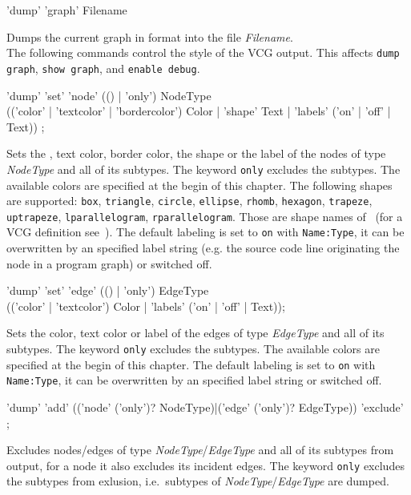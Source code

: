 \begin{rail}
  'dump' 'graph' Filename
\end{rail}
Dumps the current graph in  format into the file \emph{Filename}.\\

The following commands control the style of the VCG output. This affects \texttt{dump graph}, \texttt{show graph}, and \texttt{enable debug}. 
\begin{rail}
  'dump' 'set' 'node' (() | 'only') NodeType \\ (('color' | 'textcolor' | 'bordercolor') Color | 'shape' Text | 'labels' ('on' | 'off' | Text)) ;
\end{rail}
Sets the , text color, border color, the shape or the label of the nodes of type \emph{NodeType} and all of its subtypes.
The keyword \texttt{only} excludes the subtypes. The available colors are specified at the begin of this chapter. 
The following shapes are supported: \texttt{box}, \texttt{triangle}, \texttt{circle}, \texttt{ellipse}, \texttt{rhomb}, \texttt{hexagon}, \texttt{trapeze}, \texttt{uptrapeze}, \texttt{lparallelogram}, \texttt{rparallelogram}.
Those are shape names of \yComp\ (for a VCG definition see~\cite{vcg}).
The default labeling is set to \texttt{on} with \texttt{Name:Type}, it can be overwritten by an specified label string (e.g. the source code line originating the node in a program graph) or switched off.

\begin{rail}
  'dump' 'set' 'edge' (() | 'only') EdgeType \\ (('color' | 'textcolor') Color | 'labels' ('on' | 'off' | Text));
\end{rail}
Sets the color, text color or label of the edges of type \emph{EdgeType} and all of its subtypes.
The keyword \texttt{only} excludes the subtypes. The available colors are specified at the begin of this chapter.
The default labeling is set to \texttt{on} with \texttt{Name:Type}, it can be overwritten by an specified label string or switched off.

\begin{rail}
  'dump' 'add' (('node' ('only')? NodeType)|('edge' ('only')? EdgeType)) 'exclude' ;
\end{rail}
Excludes nodes/edges of type \emph{NodeType}/\emph{EdgeType} and all of its subtypes from output, for a node it also excludes its incident edges.
The keyword \texttt{only} excludes the subtypes from exlusion, i.e.\ subtypes of \emph{NodeType}/\emph{EdgeType} are dumped.

